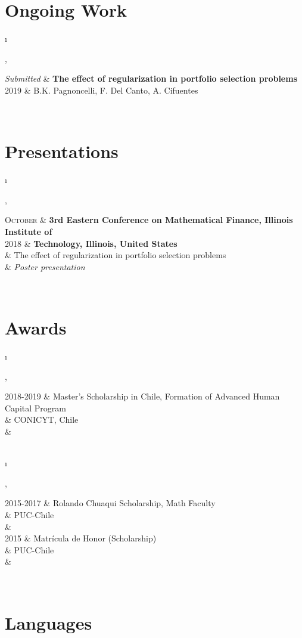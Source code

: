 \documentclass[a4paper,10pt]{article}
\newcommand{\tablength}{}
\newcommand{\setTabParams}[1]{\renewcommand\tablength{}\forcsvlist{\listadd\tablength}{#1}}
\newcommand{\setCols}[1]{			%
	\ifnum0=\i						%
		\ifdim0cm=#1				%
			\def \firstCol {r}		%
		\else						%
			\def \firstCol {p{#1}}		%
		\fi						%
	\else \ifnum1=\i				%
		\ifdim0cm=#1				%
			\def \secondCol {l}		%
		\else						%
			\def \secondCol{p{#1}}	%
		\fi						%
	\else \ifnum2=\i				%
		\ifnum0=#1				%
			\def \sep {}			%
		\else						%
			\def \sep {|}			%
		\fi						%
	\fi \fi \fi						%
	\advance\i by1					%
}
\newcommand{\tab}[1]{					%
	\newcount\i						%
	\forlistloop{\setCols}{\tablength}		%
	\begin{tabular}{\firstCol \sep \secondCol}	%
		#1							%
	\end{tabular} \\						%
}
\begin{document}
\section{Ongoing Work}
\setTabParams{0cm,11cm,1}

\tab{
\emph{Submitted}
 	&	\textbf{The effect of regularization in portfolio selection problems} \\
\textsc{2019}
	&	\footnotesize{B.K. Pagnoncelli, F. Del Canto, A. Cifuentes}	\\
}
	
\section{Presentations}
\setTabParams{0cm,11cm,1}

\tab{
\textsc{October}
 	&	\textbf{3rd Eastern Conference on Mathematical Finance, Illinois Institute of}	\\
\textsc{2018}
	&	\textbf{Technology, Illinois, United States} \\
	&	The effect of regularization in portfolio selection problems	\\
	&	\emph{Poster presentation}
}

\section{Awards}
\setTabParams{0cm,11cm,0}

\tab{
\textsc{2018-2019} 
	&	Master's Scholarship in Chile, Formation of Advanced Human Capital Program	\\
	&	CONICYT, Chile	\\
	&	\\
}

\tab{
\textsc{2015-2017} 
	&	Rolando Chuaqui Scholarship, Math Faculty	\\
	&	PUC-Chile	\\
	&	\\
	
\textsc{2015}
	&	Matrícula de Honor (Scholarship)	\\
	&	PUC-Chile	\\
	&	\\
}

\section{Languages}
\setTabParams{0cm,0cm,0}
\end{document}
